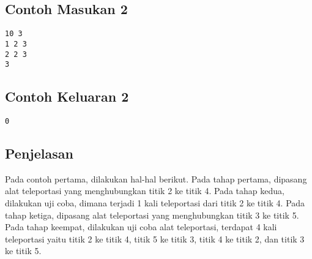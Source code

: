 \documentclass{article}
\begin{document}
\begin{multicols}{2}
\subsection*{Contoh Masukan 2}
\begin{lstlisting}
10 3
1 2 3
2 2 3
3
\end{lstlisting}
\columnbreak
\subsection*{Contoh Keluaran 2}
\begin{lstlisting}
0
\end{lstlisting}
\vfill
\null
\end{multicols}

\subsection*{Penjelasan}
Pada contoh pertama, dilakukan hal-hal berikut.
Pada tahap pertama, dipasang alat teleportasi yang menghubungkan titik 2 ke titik 4.
Pada tahap kedua, dilakukan uji coba, dimana terjadi 1 kali teleportasi dari titik 2 ke titik 4.
Pada tahap ketiga, dipasang alat teleportasi yang menghubungkan titik 3 ke titik 5.
Pada tahap keempat, dilakukan uji coba alat teleportasi, terdapat 4 kali teleportasi yaitu titik 2 ke titik 4, titik 5 ke titik 3, titik 4 ke titik 2, dan titik 3 ke titik 5.
\end{document}
